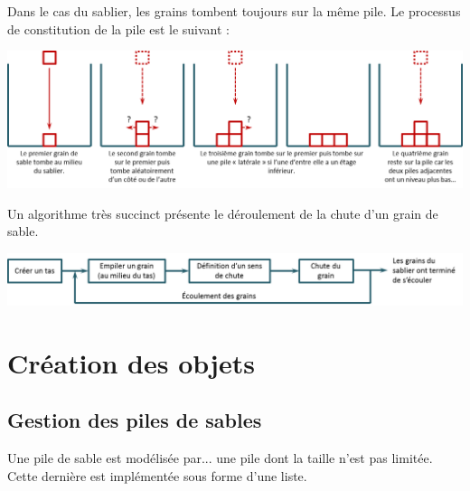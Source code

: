 \documentclass[10pt,fleqn]{article} %
\begin{document}
Dans le cas du sablier, les grains tombent toujours sur la même pile. Le processus de constitution de la pile est le suivant : 
\begin{center}
\includegraphics[width=\linewidth]{images/sablier_02}
\end{center}

Un algorithme très succinct présente le déroulement de la chute d'un grain de sable.
\begin{center}
\includegraphics[width=\linewidth]{images/algo_02}
\end{center}



\section{Création des objets}
\subsection{Gestion des piles de sables}
Une pile de sable est modélisée par... une pile dont la taille n'est pas limitée. Cette dernière est implémentée sous forme d'une liste. 
\end{document}
